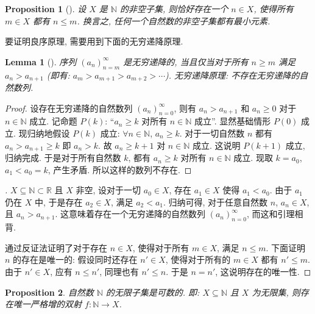 \documentclass[UTF8]{ctexart}
\theoremstyle{mystyle}
\newtheorem{lemma}{Lemma}[section]
\newtheorem{proposition}{Proposition}[section]
\theoremstyle{myremark}
\theoremstyle{plain}
\newcommand{\R}{\mathbb R}
\newcommand{\N}{\mathbb N}
\begin{document}
\begin{proposition}[]
    设 $ X $ 是 $ \N $ 的非空子集, 则恰好存在一个 $ n \in X $, 使得所有 $ m \in X $ 都有 $ n \leqslant m $. 换言之, 任何一个自然数的非空子集都有最小元素.
\end{proposition}

要证明良序原理, 需要用到下面的无穷递降原理.
\begin{lemma}[]
    序列 $ (a_n)_{n = m}^\infty $ 是无穷递降的, 当且仅当对于所有 $ n \geqslant m $ 满足 $ a_n > a_{n + 1} $ (即有: $ a_m > a_{m + 1} > a_{m + 2} > \cdots $). 无穷递降原理: 不存在无穷递降的自然数列.
\end{lemma}

\begin{proof}
    设存在无穷递降的自然数列 $ (a_n)_{n = 0}^\infty $, 则有 $ a_n > a_{n + 1} $ 和 $ a_n \geqslant 0 $ 对于 $ n \in \N $ 成立. 记命题 $ P(k) $: ``$ a_n \geqslant k $ 对所有 $ n \in \N $ 成立''. 显然基础情形 $ P(0) $ 成立. 现归纳地假设 $ P(k) $ 成立: $ \forall n \in \N $, $ a_n \geqslant k $. 对于一切自然数 $ n $ 都有 $ a_n > a_{n + 1} \geqslant k $ 即 $ a_n > k $. 故 $ a_n \geqslant k + 1 $ 对 $ n \in \N $ 成立. 这说明 $ P(k + 1) $ 成立, 归纳完成. 于是对于所有自然数 $ k $, 都有 $ a_n \geqslant k $ 对所有 $ n \in \N $ 成立. 现取 $ k = a_0 $, $ a_1 < a_0 = k $, 产生矛盾. 所以这样的数列不存在.
\end{proof}

\begin{proof}[]
    $ X \subseteq \N \subset \R $ 且 $ X $ 非空, 设对于一切 $ a_0 \in X $, 存在 $ a_1 \in X $ 使得 $ a_1 < a_0 $. 由于 $ a_1 $ 仍在 $ X $ 中, 于是存在 $ a_2 \in X $, 满足 $ a_2 < a_1 $. 归纳可得, 对于任意自然数 $ n $, $ a_n \in X $, 且 $ a_n > a_{n + 1} $. 这意味着存在一个无穷递降的自然数列 $ (a_n)_{n = 0}^\infty $, 而这和引理相背.

    通过反证法证明了对于存在 $ n \in X $, 使得对于所有 $ m \in X $, 满足 $ n \leqslant m $. 下面证明 $ n $ 的存在是唯一的: 假设同时还存在 $ n' \in X $, 使得对于所有的 $ m \in X $ 都有 $ n' \leqslant m $. 由于 $ n' \in X $, 应有 $ n \leqslant n' $, 同理也有 $ n' \leqslant n $. 于是 $ n = n' $, 这说明存在的唯一性.
\end{proof}

\begin{proposition} \label{at most countable I}
    自然数 $ \N $ 的无限子集是可数的. 即: $ X \subseteq \N $ 且 $ X $ 为无限集, 则存在唯一严格增的双射 $ f \colon \N \to X $. 
\end{proposition}
\end{document}
